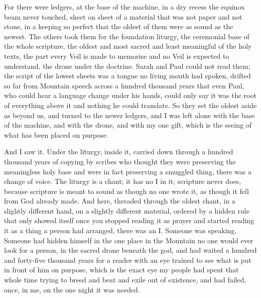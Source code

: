 For there were ledgers, at the base of the machine, in a dry recess the equinox beam never touched, sheet on sheet of a material that was not paper and not stone, in a keeping so perfect that the oldest of them were as sound as the newest. The others took them for the foundation liturgy, the ceremonial base of the whole scripture, the oldest and most sacred and least meaningful of the holy texts, the part every Veil is made to memorise and no Veil is expected to understand, the drone under the doctrine. Sarah and Paul could not read them; the script of the lowest sheets was a tongue no living mouth had spoken, drifted so far from Mountain speech across a hundred thousand years that even Paul, who could hear a language change under his hands, could only say it was the root of everything above it and nothing he could translate. So they set the oldest aside as beyond us, and turned to the newer ledgers, and I was left alone with the base of the machine, and with the drone, and with my one gift, which is the seeing of what has been placed on purpose.\par

And I saw it. Under the liturgy, inside it, carried down through a hundred thousand years of copying by scribes who thought they were preserving the meaningless holy base and were in fact preserving a smuggled thing, there was a change of voice. The liturgy is a chant; it has no I in it; scripture never does, because scripture is meant to sound as though no one wrote it, as though it fell from God already made. And here, threaded through the oldest chant, in a slightly different hand, on a slightly different material, ordered by a hidden rule that only showed itself once you stopped reading it as prayer and started reading it as a thing a person had arranged, there was an I. Someone was speaking. Someone had hidden himself in the one place in the Mountain no one would ever look for a person, in the sacred drone beneath the god, and had waited a hundred and forty-five thousand years for a reader with an eye trained to see what is put in front of him on purpose, which is the exact eye my people had spent that whole time trying to breed and beat and exile out of existence, and had failed, once, in me, on the one night it was needed.\par

